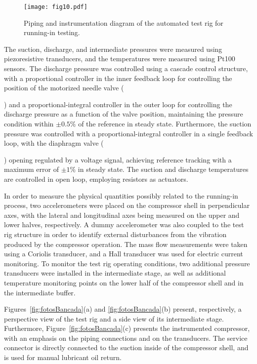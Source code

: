 \documentclass[preprint,11pt,number]{elsarticle}
\newcommand*\circled[1]{\begin{small}\tikz[baseline=(char.base)]{           \node[shape=circle,draw,minimum width=1.3em,inner sep=0.5pt] (char) {#1};}\end{small}}
\begin{document}
\begin{figure}[htb]
\begin{center}
\texttt{[image: fig10.pdf]}    %
\caption{Piping and instrumentation diagram of the automated test rig for running-in testing.} 
\label{fig:diagramaBancada}
\end{center}
\end{figure}


The suction, discharge, and intermediate pressures were measured using piezoresistive transducers, and the temperatures were measured using Pt100 sensors. The discharge pressure was controlled using a cascade control structure, with a proportional controller in the inner feedback loop for controlling the position of the motorized needle valve (\circled{3}) and a proportional-integral controller in the outer loop for controlling the discharge pressure as a function of the valve position, maintaining the pressure condition within $\pm 0.5\%$ of the reference in steady state. Furthermore, the suction pressure was controlled with a proportional-integral controller in a single feedback loop, with the diaphragm valve (\circled{2}) opening regulated by a voltage signal, achieving reference tracking with a maximum error of $\pm 1\%$ in steady state. The suction and discharge temperatures are controlled in open loop, employing resistors as actuators.

In order to measure the physical quantities possibly related to the running-in process, two accelerometers were placed on the compressor shell in perpendicular axes, with the lateral and longitudinal axes being measured on the upper and lower halves, respectively. A dummy accelerometer was also coupled to the test rig structure in order to identify external disturbances from the vibration produced by the compressor operation. The mass flow measurements were taken using a Coriolis transducer, and a Hall transducer was used for electric current monitoring. To monitor the test rig operating conditions, two additional pressure transducers were installed in the intermediate stage, as well as additional temperature monitoring points on the lower half of the compressor shell and in the intermediate buffer.

Figures~\ref{fig:fotosBancada}(a) and \ref{fig:fotosBancada}(b) present, respectively, a perspective view of the test rig and a side view of its intermediate stage. Furthermore, Figure~\ref{fig:fotosBancada}(c) presents the instrumented compressor, with an emphasis on the piping connections and on the transducers. The service connector is directly connected to the suction inside of the compressor shell, and is used for manual lubricant oil return.
\end{document}
